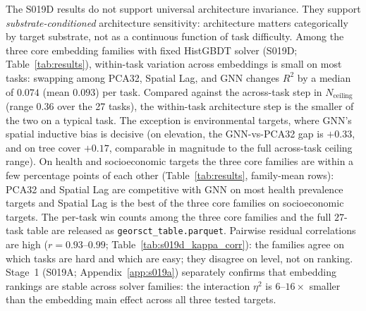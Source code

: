 \documentclass{article}
\begin{document}
The S019D results do not support universal architecture invariance. They support \emph{substrate-conditioned} architecture sensitivity: architecture matters categorically by target substrate, not as a continuous function of task difficulty. Among the three core embedding families with fixed HistGBDT solver (S019D; Table~\ref{tab:results}), within-task variation across embeddings is small on most tasks: swapping among PCA32, Spatial Lag, and GNN changes $R^2$ by a median of $0.074$ (mean $0.093$) per task. Compared against the across-task step in $N_{\text{ceiling}}$ (range $0.36$ over the 27 tasks), the within-task architecture step is the smaller of the two on a typical task. The exception is environmental targets, where GNN's spatial inductive bias is decisive (on elevation, the GNN-vs-PCA32 gap is $+0.33$, and on tree cover $+0.17$, comparable in magnitude to the full across-task ceiling range). On health and socioeconomic targets the three core families are within a few percentage points of each other (Table~\ref{tab:results}, family-mean rows): PCA32 and Spatial Lag are competitive with GNN on most health prevalence targets and Spatial Lag is the best of the three core families on socioeconomic targets. The per-task win counts among the three core families and the full $27$-task table are released as \texttt{georsct\_table.parquet}. Pairwise residual correlations are high ($r = 0.93$--$0.99$; Table~\ref{tab:s019d_kappa_corr}): the families agree on which tasks are hard and which are easy; they disagree on level, not on ranking. Stage~1 (S019A; Appendix~\ref{app:s019a}) separately confirms that embedding rankings are stable across solver families: the interaction $\eta^2$ is $6$--$16{\times}$ smaller than the embedding main effect across all three tested targets.
\end{document}
